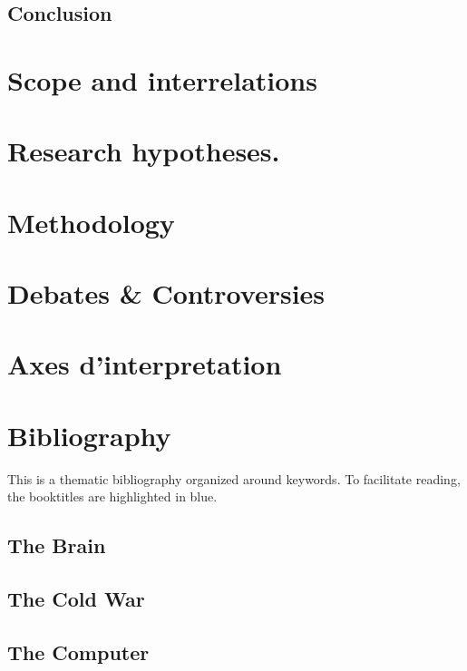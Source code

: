 \documentclass[paper=B6,portrait,twoside=true,twocolumn=false,headinclude=true,footinclude=false,fontsize=12,BCOR=10mm,DIV=calc,pagesize=auto,titlepage=firstiscover,mpinclude=false,headings=normal,headings=twolinechapter,open=right,toc=graduated,chapterprefix=false,numbers=endperiod,parskip=half+]{scrbook}
\theoremstyle{definition}
\begin{document}
\subsection{Conclusion}
\label{sec:org2d036ab}
\section{Scope and interrelations}
\label{sec:orgfe973c5}
\lipsum
\section{Research hypotheses.}
\label{sec:org928a9c0}
\lipsum
\section{Methodology}
\label{sec:org24a1bf4}

\section{Debates \& Controversies}
\label{sec:orgf60a3aa}
\lipsum
\section{Axes d'interpretation}
\label{sec:org233d9f7}
\lipsum
\section{Bibliography}
\label{sec:orgfabe903}
This is a thematic bibliography organized around keywords. To facilitate
reading, the booktitles are highlighted in blue. 

\nocite{*}
\subsection{The Brain}
\label{sec:orgd5d0eec}
\printbibliography[heading=none,keyword=memoire,keyword=brain]
\subsection{The Cold War}
\label{sec:org4d85e0d}
\printbibliography[heading=none,keyword=memoire,keyword=cold-war,notkeyword=brain]
\subsection{The Computer}
\label{sec:org1984706}
\printbibliography[heading=none,keyword=memoire,keyword=computer,notkeyword=brain,notkeyword=cold-war]
\end{document}
